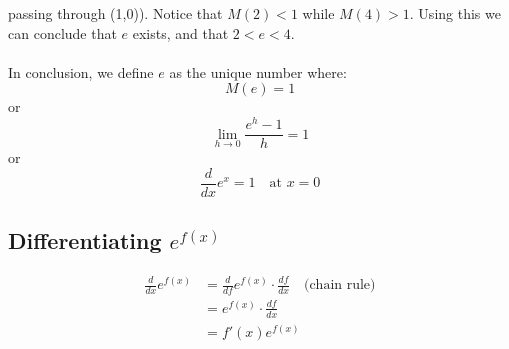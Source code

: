 \documentclass{report}
\begin{document}
passing through (1,0)). Notice that $M(2)<1$ while $M(4)>1$. Using this we can conclude
that $e$ exists, and that $2<e<4$.\\
\vspace{1mm}\\
In conclusion, we define $e$ as the unique number where:
\begin{equation*}
M(e)=1
\end{equation*}
or
\begin{equation*}
\lim_{h\to0}\frac{e^h-1}{h}=1
\end{equation*}
or
\begin{equation*}
\frac{d}{dx}e^x=1\quad\text{at $x=0$}
\end{equation*}

\subsection{Differentiating $e^{f(x)}$} %
\begin{align*}
\frac{d}{dx}e^{f(x)}&=\frac{d}{df}e^{f(x)}\cdot\frac{df}{dx}\quad\text{(chain rule)}\\
&=e^{f(x)}\cdot\frac{df}{dx}\\
&=f'(x)e^{f(x)}
\end{align*}
\newpage
\end{document}
